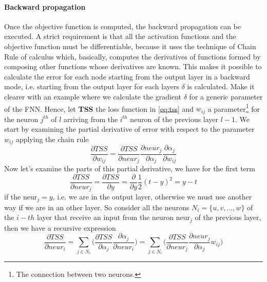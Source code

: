 \paragraph{Backward propagation}
Once the objective function is computed, the backward propagation can be executed. A strict requirement is that all the activation functions and the objective function must be differentiable, because it uses the technique of Chain Rule of calculus which, basically, computes the derivatives of functions formed by composing other functions whose derivatives are known.\newline\newline
This makes it possible to calculate the error for each node starting from the output layer in a backward mode, i.e. starting from the output layer for each layers $\delta$ is calculated. Make it clearer with an example where we calculate the gradient $\delta$ for a generic parameter of the FNN. Hence, let \textbf{TSS} the loss function in \ref{eq:tss} and $w_{ij}$ a parameter\footnote{The connection between two neurons.} for the neuron $j^{th}$ of $l$ arriving from the $i^{th}$ neuron of the previous layer $l-1$. We start by examining the partial derivative of error with respect to the parameter $w_{ij}$ applying the chain rule
\begin{equation}
	\frac{\partial{TSS}}{\partial{w_{ij}}} = \frac{\partial{TSS}}{\partial{neur_j}}\frac{\partial{neur_j}}{\partial{\alpha_j}}\frac{\partial{\alpha_j}}{\partial{w_{ij}}}
\end{equation}\label{eq:partial-derivative-w_ij}
Now let's examine the parts of this partial derivative, we have for the first term
\begin{equation}
	\frac{\partial{TSS}}{\partial{neur_j}} = \frac{\partial{TSS}}{\partial{y}} = \frac{\partial{}}{\partial{y}}\frac{1}{2}(t - y)^2 = y - t
\end{equation}\label{eq:partial-derivative-output-layer}
if the $\textrm{neur}_j = y$, i.e. we are in the output layer, otherwise we must use another way if we are in an other layer. So consider all the neurons $N_i = \{u, v, \dots, w\}$ of the $i-th$ layer that receive an input from the neuron $\textrm{neur}_j$ of the previous layer, then we have a recursive expression
\begin{equation}
	\frac{\partial{TSS}}{\partial{neur_i}} = \sum\limits_{j \in N_i}\Bigg(\frac{\partial{TSS}}{\partial\alpha_j}\frac{\partial{\alpha_j}}{\partial{neur_i}}\Bigg) = \sum\limits_{j \in N_i}\Bigg(\frac{\partial{TSS}}{\partial{neur_j}}\frac{\partial{neur_j}}{\partial{\alpha_j}}w_{ij}\Bigg)
\end{equation}\label{eq:partial-derivative-inner-layer}
